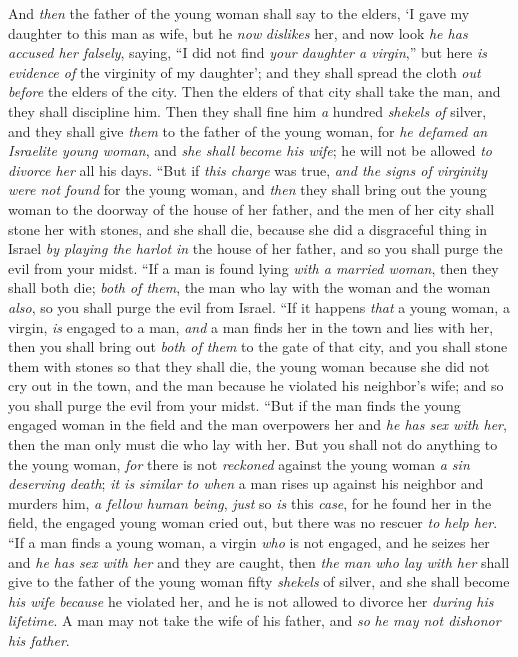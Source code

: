 \begin{biblechapter}
\verse And \textit{then} the father of the young woman shall say to the elders, ‘I gave my daughter to this man as wife, but he \textit{now} \textit{dislikes} her,
\verse and now look \textit{he has accused her falsely}, saying, “I did not find \textit{your daughter a virgin},” but here \textit{is} \textit{evidence of} the virginity of my daughter’; and they shall spread the cloth \textit{out} \textit{before} the elders of the city.
\verse Then the elders of that city shall take the man, and they shall discipline him.
\verse Then they shall fine him \textit{a} hundred \textit{shekels of} silver, and they shall give \textit{them} to the father of the young woman, for \textit{he defamed an Israelite young woman}, and \textit{she shall become his wife}; he will not be allowed \textit{to divorce her} all his days.
\verse “But if \textit{this charge} was true, \textit{and the signs of virginity were not found} for the young woman,
\verse and \textit{then} they shall bring out the young woman to the doorway of the house of her father, and the men of her city shall stone her with stones, and she shall die, because she did a disgraceful thing in Israel \textit{by playing the harlot} \textit{in} the house of her father, and so you shall purge the evil from your midst.
\verse “If a man is found lying \textit{with a married woman}, then they shall both die; \textit{both of them}, the man who lay with the woman and the woman \textit{also}, so you shall purge the evil from Israel.
\verse “If it happens \textit{that} a young woman, a virgin, \textit{is} engaged to a man, \textit{and} a man finds her in the town and lies with her,
\verse then you shall bring out \textit{both of them} to the gate of that city, and you shall stone them with stones so that they shall die, the young woman because she did not cry out in the town, and the man because he violated his neighbor’s wife; and so you shall purge the evil from your midst.
\verse “But if the man finds the young engaged woman in the field and the man overpowers her and \textit{he has sex with her}, then the man only must die who lay with her.
\verse But you shall not do anything to the young woman, \textit{for} there is not \textit{reckoned} against the young woman \textit{a sin deserving death}; \textit{it is similar to when} a man rises up against his neighbor and murders him, \textit{a fellow human being}, \textit{just} so \textit{is} this \textit{case},
\verse for he found her in the field, the engaged young woman cried out, but there was no rescuer \textit{to help her}.
\verse “If a man finds a young woman, a virgin \textit{who} is not engaged, and he seizes her and \textit{he has sex with her} and they are caught,
\verse then \textit{the man who lay with her} shall give to the father of the young woman fifty \textit{shekels} of silver, and she shall become \textit{his wife} \textit{because} he violated her, and he is not allowed to divorce her \textit{during his lifetime}.
\verse  A man may not take the wife of his father, and \textit{so} \textit{he may not dishonor his father}.
\end{biblechapter}

